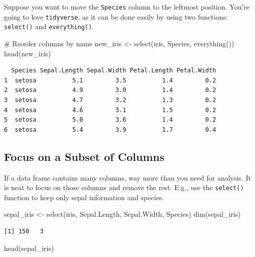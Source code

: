 \documentclass[
  letterpaper,
  DIV=11,
  numbers=noendperiod]{scrreprt}
\newenvironment{Shaded}{\begin{snugshade}}{\end{snugshade}}
\newcommand{\CommentTok}[1]{\textcolor[rgb]{0.37,0.37,0.37}{#1}}
\newcommand{\FunctionTok}[1]{\textcolor[rgb]{0.28,0.35,0.67}{#1}}
\newcommand{\NormalTok}[1]{\textcolor[rgb]{0.00,0.23,0.31}{#1}}
\newcommand{\OtherTok}[1]{\textcolor[rgb]{0.00,0.23,0.31}{#1}}
\begin{document}
Suppose you want to move the \texttt{Species} column to the leftmost
position. You're going to love \texttt{tidyverse}, as it can be done
easily by using two functions: \texttt{select()} and
\texttt{everything()}.

\begin{Shaded}
\begin{Highlighting}[]
\CommentTok{\# Reorder columns by name}
\NormalTok{new\_iris }\OtherTok{\textless{}{-}} \FunctionTok{select}\NormalTok{(iris, Species, }\FunctionTok{everything}\NormalTok{())}
\FunctionTok{head}\NormalTok{(new\_iris)}
\end{Highlighting}
\end{Shaded}

\begin{verbatim}
  Species Sepal.Length Sepal.Width Petal.Length Petal.Width
1  setosa          5.1         3.5          1.4         0.2
2  setosa          4.9         3.0          1.4         0.2
3  setosa          4.7         3.2          1.3         0.2
4  setosa          4.6         3.1          1.5         0.2
5  setosa          5.0         3.6          1.4         0.2
6  setosa          5.4         3.9          1.7         0.4
\end{verbatim}

\subsection{Focus on a Subset of
Columns}\label{focus-on-a-subset-of-columns-1}

If a data frame contains many columns, way more than you need for
analysis. It is neat to focus on those columns and remove the rest.
E.g., use the \texttt{select()} function to keep only sepal information
and species.

\begin{Shaded}
\begin{Highlighting}[]
\NormalTok{sepal\_iris }\OtherTok{\textless{}{-}} \FunctionTok{select}\NormalTok{(iris, Sepal.Length, Sepal.Width, Species)}
\FunctionTok{dim}\NormalTok{(sepal\_iris)}
\end{Highlighting}
\end{Shaded}

\begin{verbatim}
[1] 150   3
\end{verbatim}

\begin{Shaded}
\begin{Highlighting}[]
\FunctionTok{head}\NormalTok{(sepal\_iris)}
\end{Highlighting}
\end{Shaded}
\end{document}

